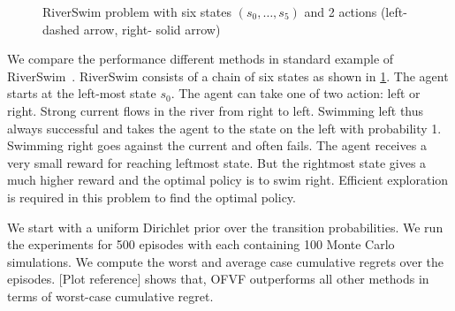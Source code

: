 \documentclass{article}
\theoremstyle{plain}
\theoremstyle{definition}
\begin{document}
\begin{figure}
\begin{center}
\end{center}
\caption{RiverSwim problem with six states $(s_0,\ldots,s_5)$ and 2 actions (left- dashed arrow, right- solid arrow)} \label{fig:RiverSwim}
\end{figure}
We compare the performance different methods in standard example of RiverSwim~\citep{Osband2013, Strehl2004}. RiverSwim consists of a chain of six states as shown in \cref{fig:RiverSwim}. The agent starts at the left-most state $s_0$. The agent can take one of two action: left or right. Strong current flows in the river from right to left. Swimming left thus always successful and takes the agent to the state on the left with probability 1. Swimming right goes against the current and often fails. The agent receives a very small reward for reaching leftmost state. But the rightmost state gives a much higher reward and the optimal policy is to swim right. Efficient exploration is required in this problem to find the optimal policy.

We start with a uniform Dirichlet prior over the transition probabilities. We run the experiments for 500 episodes with each containing 100 Monte Carlo simulations. We compute the worst and average case cumulative regrets over the episodes. [Plot reference] shows that, OFVF outperforms all other methods in terms of worst-case cumulative regret.
\end{document}
